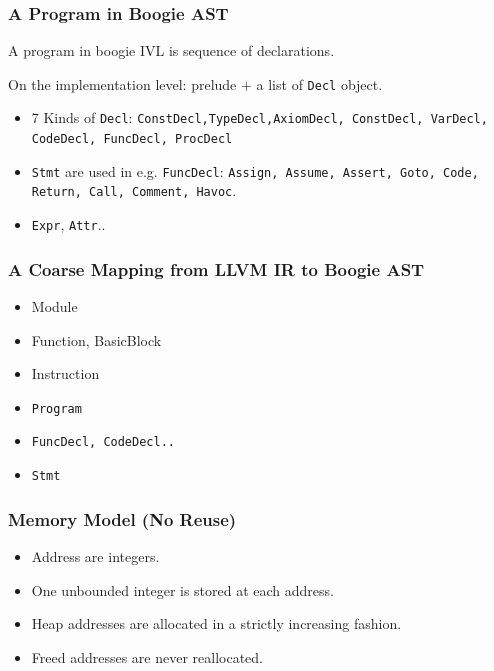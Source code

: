 \documentclass[11pt]{beamer}
\begin{document}
\begin{frame}\frametitle{A Program in Boogie AST}
\begin{definition}
A program in boogie IVL is sequence of declarations.
\end{definition}

On the implementation level: prelude $+$ a list of \texttt{Decl} object.

\begin{itemize}
\item 7 Kinds of \texttt{Decl}: \texttt{ConstDecl,TypeDecl,AxiomDecl, ConstDecl, VarDecl, CodeDecl, FuncDecl, ProcDecl}

\item \texttt{Stmt} are used in e.g. \texttt{FuncDecl}: \texttt{Assign, Assume, Assert, Goto, Code, Return, Call, Comment, Havoc}.
\item \texttt{Expr}, \texttt{Attr}..
\end{itemize}
\end{frame}


\begin{frame}\frametitle{A Coarse Mapping from LLVM IR to Boogie AST}

\begin{multicols}{2}
\begin{itemize}
\item Module
\item Function, BasicBlock
\item Instruction
\end{itemize}


\begin{itemize}
\item \texttt{Program}
\item \texttt{FuncDecl, CodeDecl..}
\item \texttt{Stmt}
\end{itemize}
\end{multicols}


\end{frame}


\begin{frame}\frametitle{Memory Model (No Reuse)}
\begin{itemize}
\item Address are integers.
\item One unbounded integer is stored at each address.
\item Heap addresses are allocated in a strictly increasing fashion.
\item Freed addresses are never reallocated.

\end{itemize}


\end{frame}
\end{document}
